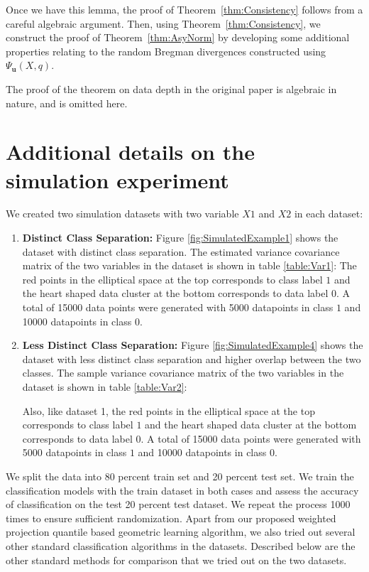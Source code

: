\documentclass[twoside]{article}
\begin{document}
Once we have this lemma, the proof of Theorem~\ref{thm:Consistency} follows from 
a careful algebraic argument. Then, using Theorem~\ref{thm:Consistency}, we 
construct the proof of Theorem~\ref{thm:AsyNorm} by developing some additional 
properties relating to the random Bregman divergences constructed using 
$\Psi_{\mathbf{u}} (X, q)$. 


The proof of the theorem on data depth in the original paper is algebraic in nature, 
and is omitted here.

 \section{Additional details on the simulation experiment}


We created two simulation datasets with two variable $X1$ and $X2$ in each dataset:

\begin{enumerate}

\item \textbf{Distinct Class Separation:} Figure \ref{fig:SimulatedExample1} shows the dataset with distinct class separation. The estimated variance covariance matrix of the two variables in the dataset is shown in table \ref{table:Var1}: 
The red points in the elliptical space at the top corresponds to class label $1$ and the heart shaped data cluster at the bottom corresponds to data label $0$. A total of 15000 data points were generated with 5000 datapoints in class $1$ and 10000 datapoints in class $0$. 

\item \textbf{Less Distinct Class Separation:} Figure \ref{fig:SimulatedExample4} shows the dataset with less distinct class separation and higher overlap between the two classes. The sample variance covariance matrix of the two variables in the dataset is shown in table \ref{table:Var2}: 


Also, like dataset 1, the red points in the elliptical space at the top corresponds to class label $1$ and the heart shaped data cluster at the bottom corresponds to data label $0$. A total of 15000 data points were generated with 5000 datapoints in class $1$ and 10000 datapoints in class $0$. 

\end{enumerate}

We split the data into 80 percent train set and 20 percent test set. We train the classification models with the train dataset in both cases and assess the accuracy of classification on the test 20 percent test dataset. We repeat the process 1000 times to ensure sufficient randomization. Apart from our proposed weighted projection quantile based geometric learning algorithm, we also tried out several other standard classification algorithms in the datasets. Described below are the other standard methods for comparison that we tried out on the two datasets.
\end{document}
